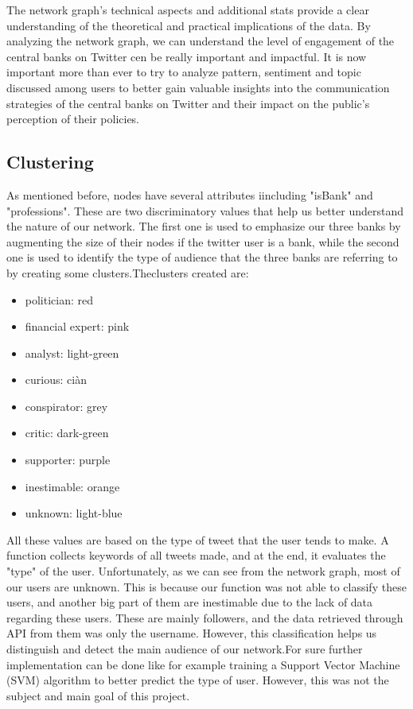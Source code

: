 \documentclass[fleqn,10pt]{SelfArx} %
\begin{document}
The network graph's technical aspects and additional stats provide a clear understanding of the theoretical and practical implications of the data. By analyzing the network graph, we can understand the level of engagement of the central banks on Twitter cen be really important and impactful.  It is now important more than ever to try to analyze pattern, sentiment and topic discussed among users to better gain valuable insights into the communication strategies of the central banks on Twitter and their impact on the public's perception of their policies.



\subsection{Clustering}


As mentioned before, nodes have several attributes iincluding "isBank" and "professions". These are two discriminatory values that help us better understand the nature of our network. The first one is used to emphasize our three banks by augmenting the size of their nodes if the twitter user is a bank, while the second one is used to identify the type of audience that the three banks are referring to by creating some clusters.Theclusters created are:
\begin{itemize}[noitemsep] %
	\item politician: red
	\item financial expert: pink
	\item analyst: light-green
	\item curious: ciàn
	\item conspirator: grey 
	\item critic: dark-green
	\item supporter: purple
	\item inestimable: orange
	\item unknown: light-blue
\end{itemize}
All these values are based on the type of tweet that the user tends to make. A function collects keywords of all tweets made, and at the end, it evaluates the "type" of the user. Unfortunately, as we can see from the network graph, most of our users are unknown. This is because our function was not able to classify these users, and another big part of them are inestimable due to the lack of data regarding these users. These are mainly followers, and the data retrieved through API from them was only the username. However, this classification helps us distinguish and detect the main audience of our network.For sure further implementation can be done like for example training a Support Vector Machine (SVM) algorithm to better predict the type of user. However, this was not the subject and main goal of this project.
\end{document}
